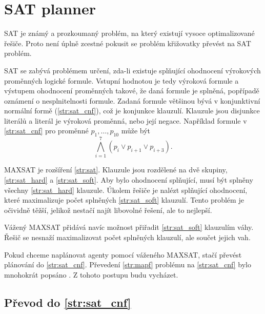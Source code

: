 \section{SAT planner}\label{sec:sat_planner}

%
%

SAT je známý a prozkoumaný problém, na který existují vysoce optimalizované řešiče.
Proto není úplně zcestné pokusit se problém křižovatky převést na SAT problém.

SAT se zabývá problémem určení,
zda-li existuje splňující ohodnocení výrokových proměnných logické formule.
Vstupní hodnotou je tedy výroková formule a výstupem ohodnocení proměnných takové,
že daná formule je splněná, popřípadě oznámení o nesplnitelnosti formule.
Zadaná formule většinou bývá v konjunktivní normální formě (\ref{str:sat_cnf}), což je konjunkce klauzulí.
Klauzule jsou disjunkce literálů a literál je výroková proměnná, nebo její negace.
Například formule v \ref{str:sat_cnf} pro proměnné $p_1, \dots, p_{10}$ může být
\[
	\bigwedge_{i=1}^{7}(p_i \vee p_{i+1} \vee p_{i + 3}).
\]

MAXSAT je rozšíření \ref{str:sat}.
Klauzule jsou rozdělené na dvě skupiny,
\ref{str:sat_hard} a \ref{str:sat_soft}.
Aby bylo ohodnocení splňující, musí být splněny všechny \ref{str:sat_hard} klauzule.
Úkolem řešiče je nalézt splňující ohodnocení, které maximalizuje počet splněných \ref{str:sat_soft} klauzulí.
Tento problém je očividně těžší, jelikož nestačí najít libovolné řešení, ale to nejlepší.

Vážený MAXSAT přidává navíc možnost přiřadit \ref{str:sat_soft} klauzulím váhy.
Řešič se nesnaží maximalizovat počet splněných klauzulí, ale součet jejich vah.

Pokud chceme naplánovat agenty pomocí váženého MAXSAT, stačí převést plánování do \ref{str:sat_cnf}.
Převedení \ref{str:mapf} problému na \ref{str:sat_cnf} bylo mnohokrát popsáno \citep{bartak}.
Z tohoto postupu budu vycházet.

\subsection{Převod do \ref{str:sat_cnf}}\label{subsec:sat_prevod_do_cnf}

